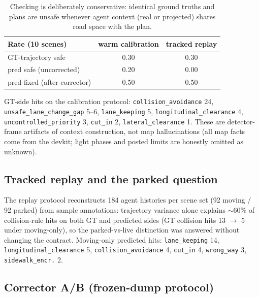\documentclass[11pt]{article}
\begin{document}
\begin{table}[h]
\centering\small
\begin{tabular}{lcc}
\toprule
Rate (10 scenes) & warm calibration & tracked replay \\
\midrule
GT-trajectory safe & 0.30 & 0.30 \\
pred safe (uncorrected) & 0.20 & 0.00 \\
pred fixed (after corrector) & 0.50 & 0.50 \\
\bottomrule
\end{tabular}
\caption{Checking is deliberately conservative: identical ground
truths and plans are unsafe whenever agent context (real or
projected) shares road space with the plan.}
\label{tab:rates}
\end{table}

GT-side hits on the calibration protocol: \texttt{collision\_avoidance}
24, \texttt{unsafe\_lane\_change\_gap} 5--6, \texttt{lane\_keeping} 5,
\texttt{longitudinal\_clearance} 4, \texttt{uncontrolled\_priority} 3,
\texttt{cut\_in} 2, \texttt{lateral\_clearance} 1. These are
detector-frame artifacts of context construction, not map
hallucinations (all map facts come from the devkit; light phases and
posted limits are honestly omitted as unknown).

\subsection{Tracked replay and the parked question}
The replay protocol reconstructs 184 agent histories per scene set
(92 moving / 92 parked) from sample annotations: trajectory variance
alone explains $\sim$60\% of collision-rule hits on both GT and
predicted sides (GT collision hits 13 $\to$ 5 under moving-only), so
the parked-vs-live distinction was answered without changing the
contract. Moving-only predicted hits: \texttt{lane\_keeping} 14,
\texttt{longitudinal\_clearance} 5, \texttt{collision\_avoidance} 4,
\texttt{cut\_in} 4, \texttt{wrong\_way} 3, \texttt{sidewalk\_encr.} 2.

\subsection{Corrector A/B (frozen-dump protocol)}
\end{document}
